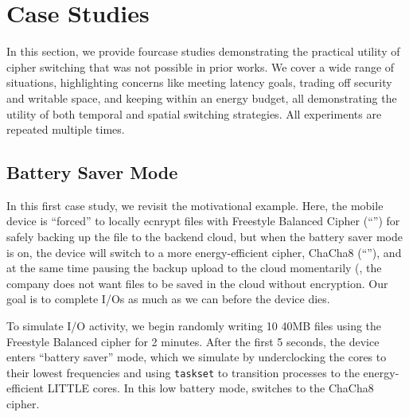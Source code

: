 

\section{Case Studies} 
\label{sec:usecases}

In this section, we provide four\xxx case studies demonstrating the
practical utility of cipher switching that was not possible in prior
works.   
We cover a wide range of situations, highlighting concerns like
meeting latency goals, trading off security and writable space, and
keeping within an energy budget, all demonstrating the utility of both
temporal and spatial switching strategies.  All experiments are repeated
multiple times.


\subsection{Battery Saver Mode} 
\label{subsec:uc1}



In this first case study, we revisit the motivational example.  Here, the
mobile device is ``forced'' to locally ecnrypt files with Freestyle
Balanced Cipher (``\cone'') for safely backing up the file to the backend
cloud, but when the battery saver mode is on, the device will switch to a
more energy-efficient cipher, ChaCha8 (``\ctwo''), and at the same time
pausing the backup upload to the cloud momentarily (\eg, the company does
not want files to be saved in the cloud without \cone encryption.
Our goal is to complete I/Os as much as we can before the device dies. 


To simulate I/O activity, we begin randomly writing 10 40MB files using
the Freestyle Balanced cipher for 2 minutes.  After the first 5 seconds, the device
enters ``battery saver'' mode, which we simulate by underclocking the
cores to their lowest frequencies and using \texttt{taskset} to transition
\sys processes to the energy-efficient LITTLE cores.  In this low battery
mode, \sys switches to the ChaCha8 cipher.






